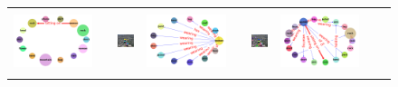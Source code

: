 \begin{figure}
\begin{tabular}{p{0.3cm}|rc|p{0.1cm}rc|p{0.1cm}rc}
		\includegraphics[width=\figwidthvis, align=c]{2320504_ours_zs_graph_gt.png} & & \includegraphics[width=\figwidthvis, height=1.8cm, align=c]{2320504_ours_zs_baseline.png} &
		\includegraphics[width=\figwidthvis, align=c]{2320504_ours_zs_graph_baseline.png} & 
		& 
		\includegraphics[width=\figwidthvis, height=1.8cm, align=c]{2320504_ours_zs_ours.png} & 
		\includegraphics[width=\figwidthvis, align=c]{2320504_ours_zs_graph_ours.png} \Tstrutmore\Bstrut\\

\end{tabular}
\end{figure}
